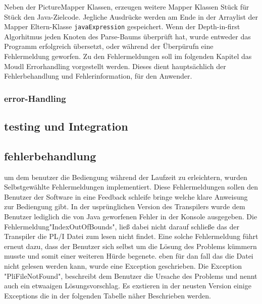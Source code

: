 Neben der PictureMapper Klassen, erzeugen weitere Mapper Klassen Stück für Stück den Java-Zielcode. 
Jegliche Ausdrücke werden am Ende in der Arraylist der Mapper Eltern-Klasse \verb+javaExpression+ gespeichert.
Wenn der Depth-in-first Algorhitmus jeden Knoten des Parse-Baums überprüft hat, wurde entweder das Programm erfolgreich übersetzt, oder während der Überpürufn 
eine Fehlermeldung geworfen.
Zu den Fehlermeldungen soll im folgenden Kapitel das Moudl Errorhandling vorgestellt werden.
Dieses dient hauptsächlich der Fehlerbehandlung und Fehlerinformation, für den Anwender.

\subsubsection{error-Handling}

\subsection{testing und Integration}




\subsection{fehlerbehandlung}
um dem benutzer die Bediengung während der Laufzeit zu erleichtern, wurden Selbstgewählte Fehlermeldungen implementiert. Diese Fehlermeldungen sollen den Benutzer der Software in eine Feedback schleife bringe welche klare Anweisung zur Bediengung gibt. In der usprünglichen Version des Transpilers wurde dem Benutzer lediglich die von Java geworfenen Fehler in der Konsole ausgegeben. Die Fehlermeldung"IndexOutOfBounds", ließ dabei nicht darauf schließe das der Transpiler die PL/I Datei zum lesen nicht findet. Eine solche Fehlermeldung führt erneut dazu, dass der Benutzer sich selbst um die Lösung des Problems kümmern musste und somit einer weiteren Hürde begenete.
eben für dan fall das die Datei nicht gelesen werden kann, wurde eine Exception geschrieben. Die Exception "PliFileNotFound", beschreibt dem Benutzer die Ursache des Problems und nennt auch ein etwaaigen Lösungsvorschlag. Es exstieren in der neusten Version einige Exceptions die in der folgenden Tabelle näher Beschrieben werden.

